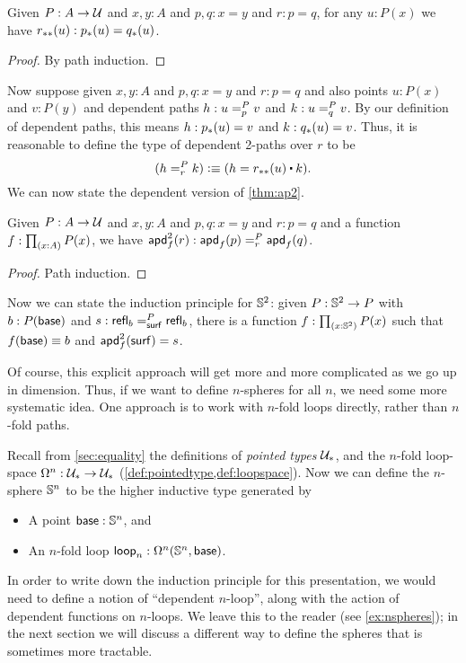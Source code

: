 \begin{lem}\label{thm:transport2}
  Given $P:A\to\type$ and $x,y:A$ and $p,q:x=y$ and $r:p=q$, for any $u:P(x)$ we have $\transtwo r u : \trans p u = \trans q u$.
\end{lem}
\begin{proof}
  By path induction.
\end{proof}

Now suppose given $x,y:A$ and $p,q:x=y$ and $r:p=q$ and also points $u:P(x)$ and $v:P(y)$ and dependent paths $h:\dpath P p u v$ and $k:\dpath P q u v$.
By our definition of dependent paths, this means $h:\trans p u = v$ and $k:\trans q u = v$.
Thus, it is reasonable to define the type of dependent 2-paths over $r$ to be
\[ (\dpath P r h k )\defeq (h = \transtwo r u \ct k). \]
We can now state the dependent version of \autoref{thm:ap2}.

\begin{lem}\label{thm:apd2}
  Given $P:A\to\type$ and $x,y:A$ and $p,q:x=y$ and $r:p=q$ and a function $f:\prd{x:A} P(x)$, we have
  $\apdtwo f r : \dpath P r {\apd f p}{\apd f q}$.
\end{lem}
\begin{proof}
  Path induction.
\end{proof}

Now we can state the induction principle for $\Sn^2$: given $P:\Sn^2\to P$ with $b:P(\base)$ and $s:\dpath P \surf {\refl b}{\refl b}$, there is a function $f:\prd{x:\Sn^2} P(x)$ such that $f(\base)\jdeq b$ and $\apdtwo f \surf = s$.

Of course, this explicit approach will get more and more complicated as we go up in dimension.
Thus, if we want to define $n$-spheres for all $n$, we need some more systematic idea.
One approach is to work with $n$-fold loops directly, rather than $n$-fold paths.

Recall from \autoref{sec:equality} the definitions of \emph{pointed types} $\type_*$, and the $n$-fold loop-space $\Omega^n : \type_* \to \type_*$
(\cref{def:pointedtype,def:loopspace}).  Now we can define the
$n$-sphere $\Sn^n$ to be the higher inductive type generated by
\begin{itemize}
\item A point $\base:\Sn^n$, and
\item An $n$-fold loop $\lloop_n : \Omega^n(\Sn^n,\base)$.
\end{itemize}
In order to write down the induction principle for this presentation, we would need to define a notion of ``dependent $n$-loop'', along with the action of dependent functions on $n$-loops.
We leave this to the reader (see \autoref{ex:nspheres}); in the next section we will discuss a different way to define the spheres that is sometimes more tractable.


